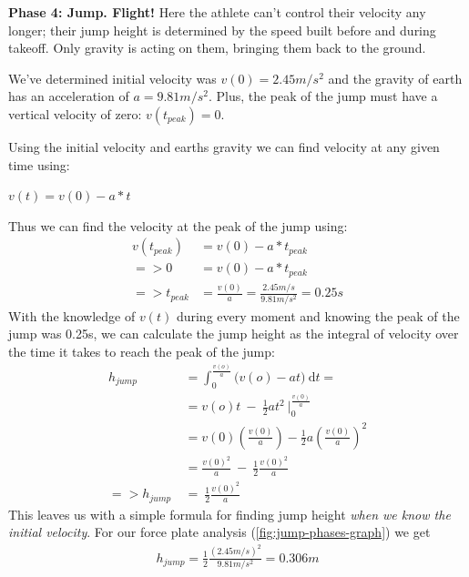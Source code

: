 \textbf{Phase 4: Jump. Flight!}
Here the athlete can't control their velocity any longer; their jump height
is determined by the speed built before and during takeoff. Only gravity is acting on them,
bringing them back to the ground.
\par
We've determined initial velocity was $v(0)=2.45 m/s^2$ and
the gravity of earth has an acceleration of $a=9.81m/s^2$. Plus, the peak
of the jump must have a vertical velocity of zero: $v(t_{peak})=0$.
\par
Using the initial velocity and earths gravity we can find velocity at any given time using:
\vspace{-5mm}
\begin{center}
$
\displaystyle
v(t)=v(0) -a * t
$
\end{center}
\vspace{-5mm}
Thus we can find the velocity at the peak of the jump using:
\[\displaystyle
\begin{aligned}
v(t_{peak}) &= v(0) - a * t_{peak} \\
=> 0 &= v(0) - a * t_{peak} \\
=> t_{peak} &= \frac{v(0)}{a} = \frac{2.45m/s}{9.81m/s^2} = 0.25s
\end{aligned}\]
With the knowledge of $v(t)$ during every moment and knowing the peak of the jump
was 0.25s, we can calculate the jump height as the integral of velocity over the time
it takes to reach the peak of the jump:
\[\displaystyle
\begin{aligned}
h_{jump} &= \int_0^{\frac{v(o)}{a}} \bigg( v(o) - at \bigg) \ \mathrm{d}t= \\
& = v(o)t \ - \ \frac{1}{2} at^2 \ \bigg|_0^{\frac{v(0)}{a}} \\
& = v(0) \left(\frac{v(0)}{a}\right) - \frac{1}{2} a \left(\frac{v(0)}{a}\right)^2 \\
& = \frac{v(0)^2}{a} \ - \ \frac{1}{2} \frac{v(0)^2}{a} \\
=> h_{jump} \ &= \ \frac{1}{2} \frac{v(0)^2}{a} 
\end{aligned}\]
This leaves us with a simple formula for finding jump height
\textit{when we know the initial velocity}. 
For our force plate analysis (\cref{fig:jump-phases-graph}) we get
\[
	\begin{aligned}
		h_{jump} = \frac{1}{2} \frac{(2.45m/s)^2}{9.81 m/s^2} = 0.306m			
	\end{aligned}
\]

